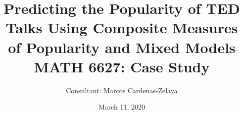 \documentclass{beamer}
\title[]{Predicting the Popularity of TED Talks Using Composite Measures of Popularity and Mixed Models\\ 
{
\medskip
}
\small MATH 6627: Case Study}
\author{Consultant: Marcos Cardenas-Zelaya} %

{

\medskip

}
\date{March 11, 2020} %
\begin{document}
	
\begin{frame}
	\titlepage 
\end{frame}





%
%
%
%
%


\end{document}
